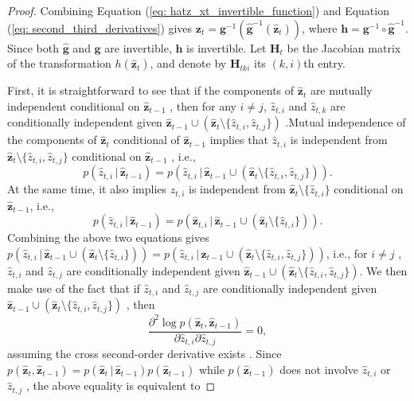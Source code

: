\begin{proof}
    Combining Equation (\ref{eq: hatz_xt_invertible_function}) and Equation (\ref{eq: second_third_derivatives}) gives $\mathbf{z}_t=\mathbf{g}^{-1}(\hat{\mathbf{g}}^{-1}(\hat{\mathbf{z}}_t))$, where $\mathbf{h}=\mathbf{g}^{-1}\circ \hat{\mathbf{g}}^{-1}$.
 Since both $\hat{\mathbf{g}}$ and $\mathbf{g}$ are invertible, $\mathbf{h}$ is invertible. Let $\mathbf{H}_t$ be the Jacobian matrix of the transformation $h(\hat{\mathbf{z}}_t)$, and denote by $\mathbf{H}_{tki}$ its $(k,i)$th entry.

 First, it is straightforward to see that if the components of $\hat{\mathbf{z}}_t$ are mutually independent conditional on $\hat{\mathbf{z}}_{t-1}$ , then for any $i\neq j$, $\hat{z}_{t,i}$ and $\hat{z}_{t,k}$ are conditionally independent given $\hat{\mathbf{z}}_{t-1} \cup (\hat{\mathbf{z}}_t \setminus \{\hat{z}_{t,i},\hat{z}_{t,j}\}) $ .Mutual independence of the components of $\hat{\mathbf{z}}_t$ conditional of $\hat{\mathbf{z}}_{t-1}$ implies that $\hat{z}_{t,i}$ is independent from $\hat{\mathbf{z}}_t \setminus \{\hat{z}_{t,i}, \hat{z}_{t,j} \}$ conditional on $\hat{\mathbf{z}}_{t-1}$ , i.e.,
 $$p(\hat{z}_{t,i} \,|\, \hat{\mathbf{z}}_{t-1}) = p(\hat{z}_{t,i} \,|\, \hat{\mathbf{z}}_{t-1} \cup (\hat{\mathbf{z}}_t \setminus \{\hat{z}_{t,i},\hat{z}_{t,j}\})).$$
At the same time, it also implies $\hat{z}_{t,i}$ is independent from $\hat{\mathbf{z}}_{t} \setminus \{\hat{z}_{t,i}\}$ conditional on $\hat{\mathbf{z}}_{t-1}$, i.e.,
    $$p(\hat{z}_{t,i} \,|\, \hat{\mathbf{z}}_{t-1}) = p(\hat{\mathbf{z}}_{t,i} \,|\, \hat{\mathbf{z}}_{t-1} \cup (\hat{\mathbf{z}}_t \setminus \{\hat{z}_{t,i}\})).$$
Combining the above two equations gives $ p(\hat{z}_{t,i} \,|\, \hat{\mathbf{z}}_{t-1} \cup (\hat{\mathbf{z}}_t \setminus  \{\hat{z}_{t,i}\}))=
p(\hat{z}_{t,i} \,|\, \hat{\mathbf{z}}_{t-1} \cup (\hat{\mathbf{z}}_t  \setminus  \{\hat{z}_{t,i},\hat{z}_{t,j}\}))$, i.e., for $i\neq j$ , $\hat{z}_{t,i}$ and $\hat{z}_{t,j}$ are conditionally independent given $\hat{\mathbf{z}}_{t-1} \cup (\hat{\mathbf{z}}_t\setminus \{\hat{z}_{t,i}, \hat{z}_{t,j}\})$.
We then make use of the fact that if $\hat{z}_{t,i}$ and $\hat{z}_{t,j}$ are conditionally independent given $\hat{\mathbf{z}}_{t-1} \cup (\hat{\mathbf{z}}_t\setminus \{\hat{z}_{t,i}, \hat{z}_{t,j}\})$ , then
    $$\frac{\partial^2\log p(\hat{\mathbf{z}}_t,\hat{\mathbf{z}}_{t-1})} {\partial \hat{z}_{t,i} \partial \hat{z}_{t,j}} = 0,$$
assuming the cross second-order derivative exists . Since $p(\hat{\mathbf{z}}_t,\hat{\mathbf{z}}_{t-1})=p(\hat{\mathbf{z}}_t \,|\, \hat{\mathbf{z}}_{t-1})p(\hat{\mathbf{z}}_{t-1})$ while $p(\hat{\mathbf{z}}_{t-1})$ does not involve $\hat{z}_{t,i}$ or $\hat{z}_{t,j}$ , the above equality is equivalent to

\end{proof}

